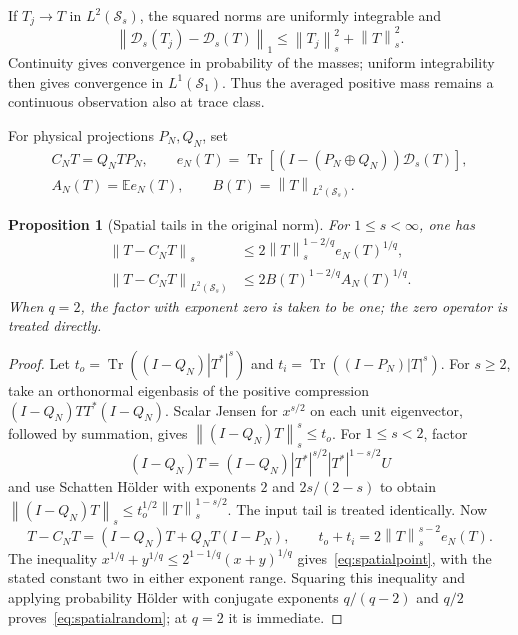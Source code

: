\documentclass[11pt,a4paper]{amsart}
\numberwithin{equation}{section}
\newtheorem{proposition}[theorem]{Proposition}
\theoremstyle{definition}
\theoremstyle{remark}
\newcommand{\E}{\mathbb E}
\newcommand{\Sch}{\mathcal S}
\DeclareMathOperator{\Tr}{Tr}
\newcommand{\norm}[1]{\left\lVert#1\right\rVert}
\newcommand{\Dens}{\mathscr D_s}
\begin{document}
If $T_j\to T$ in $L^2(\Sch_s)$, the squared norms are uniformly integrable and
\[
 \norm{\Dens(T_j)-\Dens(T)}_1\le\norm{T_j}_s^2+\norm T_s^2.
\]
Continuity gives convergence in probability of the masses; uniform integrability then gives convergence in $L^1(\Sch_1)$. Thus the averaged positive mass remains a continuous observation also at trace class.

For physical projections $P_N,Q_N$, set
\[
 \begin{gathered}
 C_NT=Q_NTP_N,\qquad
 e_N(T)=\Tr[(I-(P_N\oplus Q_N))\Dens(T)],\\
 A_N(T)=\E e_N(T),\qquad B(T)=\norm T_{L^2(\Sch_s)}.
 \end{gathered}
\]

\begin{proposition}[Spatial tails in the original norm]\label{prop:massbound}
For $1\le s<\infty$, one has
\begin{align}
 \norm{T-C_NT}_s&\le2\norm T_s^{1-2/q}e_N(T)^{1/q},\label{eq:spatialpoint}\\
 \norm{T-C_NT}_{L^2(\Sch_s)}&\le2B(T)^{1-2/q}A_N(T)^{1/q}.\label{eq:spatialrandom}
\end{align}
When $q=2$, the factor with exponent zero is taken to be one; the zero operator is treated directly.
\end{proposition}
\begin{proof}
Let $t_o=\Tr((I-Q_N)|T^*|^s)$ and $t_i=\Tr((I-P_N)|T|^s)$.
For $s\ge2$, take an orthonormal eigenbasis of the positive compression $(I-Q_N)TT^*(I-Q_N)$. Scalar Jensen for $x^{s/2}$ on each unit eigenvector, followed by summation, gives
$\norm{(I-Q_N)T}_s^s\le t_o$.
For $1\le s<2$, factor
\[
 (I-Q_N)T=(I-Q_N)|T^*|^{s/2}|T^*|^{1-s/2}U
\]
and use Schatten H\"older with exponents $2$ and $2s/(2-s)$ to obtain
$\norm{(I-Q_N)T}_s\le t_o^{1/2}\norm T_s^{1-s/2}$.
The input tail is treated identically. Now
\[
 T-C_NT=(I-Q_N)T+Q_NT(I-P_N),\qquad
 t_o+t_i=2\norm T_s^{s-2}e_N(T).
\]
The inequality $x^{1/q}+y^{1/q}\le2^{1-1/q}(x+y)^{1/q}$ gives~\eqref{eq:spatialpoint}, with the stated constant two in either exponent range. Squaring this inequality and applying probability H\"older with conjugate exponents $q/(q-2)$ and $q/2$ proves~\eqref{eq:spatialrandom}; at $q=2$ it is immediate.
\end{proof}
\end{document}

